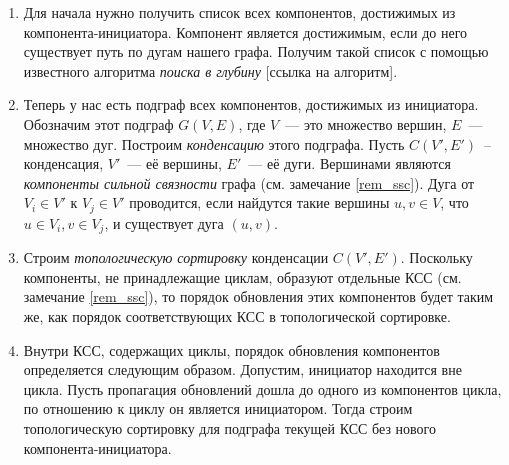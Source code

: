 \begin{enumerate}
	\item Для начала нужно получить список всех компонентов, достижимых из компонента-инициатора. Компонент является достижимым, если до него существует путь по дугам нашего графа. Получим такой список с помощью известного алгоритма \textit{поиска в глубину} [ссылка на алгоритм].
	\item Теперь у нас есть подграф всех компонентов, достижимых из инициатора. Обозначим этот подграф $G(V, E)$, где $V$~--- это множество вершин, $E$~--- множество дуг. Построим \textit{конденсацию} этого подграфа. Пусть $C(V', E')$~-- конденсация, $V'$~--- её вершины, $E'$~--- её дуги. Вершинами являются \textit{компоненты сильной связности} графа (см. замечание \ref{rem_ssc}). Дуга от $V_i \in V'$ к $V_j \in V'$ проводится, если найдутся такие вершины $u, v \in V$, что $u \in V_i, v \in V_j$, и существует дуга $(u, v)$.
	\item Строим \textit{топологическую сортировку} конденсации $C(V', E')$. Поскольку компоненты, не принадлежащие циклам, образуют отдельные КСС (см. замечание \ref{rem_ssc}), то порядок обновления этих компонентов будет таким же, как порядок соответствующих КСС в топологической сортировке.
	\item Внутри КСС, содержащих циклы, порядок обновления компонентов определяется следующим образом. Допустим, инициатор находится вне цикла. Пусть пропагация обновлений дошла до одного из компонентов цикла, по отношению к циклу он является инициатором. Тогда строим топологическую сортировку для подграфа текущей КСС без нового компонента-инициатора.
\end{enumerate}

\label{rem_ssc}


